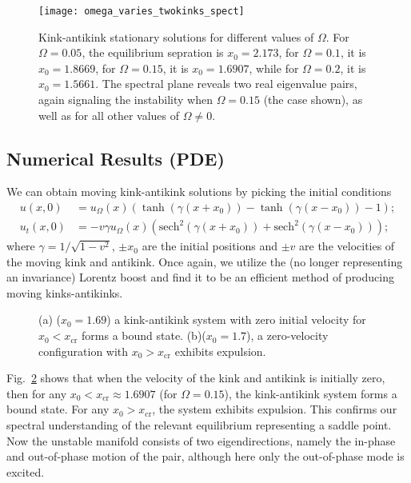 \documentclass[vecphys]{svmult}		%
\newcommand{\sech}{\text{sech}}
\begin{document}
 \begin{figure}[h]
	\centering 
		\texttt{[image: omega\_varies\_twokinks\_spect]}

	\caption{ Kink-antikink stationary solutions for
        different values of $\Omega$. For $\Omega=0.05$, the equilibrium
        sepration is $x_0=2.173$, for $\Omega=0.1$, it is $x_0=1.8669$, for
        $\Omega=0.15$, it is $x_0=1.6907$, while for $\Omega=0.2$,
        it is $x_0=1.5661$. The spectral plane reveals two real eigenvalue
        pairs, again signaling the instability when $\Omega=0.15$ (the
        case shown), as well as for all other values of $\Omega \neq 0$.} %
	\label{kink-antikink}
\end{figure} 


\subsection{Numerical Results (PDE)}
We can obtain moving kink-antikink solutions by picking the initial conditions 
\begin{align*}u(x,0)&=u_{\Omega}(x) (\tanh(\gamma (x+x_0))- \tanh(\gamma (x-x_0))-1); \\
u_t(x,0)&=-v \gamma u_{\Omega}(x) (\sech^2(\gamma(x+x_0))+ \sech^2(\gamma(x-x_0)));
\end{align*}
where $\gamma=1/\sqrt{1-v^2}$, $\pm x_0$ are 
the initial positions and $\pm v$ are the velocities of the moving kink
and antikink.
Once again,
we utilize the (no longer representing an invariance) Lorentz boost
and find it to be an efficient method of producing moving kinks-antikinks.






\begin{figure}[tbp]
\begin{center}
  \end{center}
   \caption{(a) ($x_0=1.69$) a kink-antikink system with zero initial velocity for $x_0 < x_\mathrm{cr}$ forms a bound state. (b)($x_0=1.7$), a zero-velocity configuration with $x_0>x_\mathrm{cr}$ exhibits expulsion.}
    \label{before_after_xc}
\end{figure}

Fig.~\ref{before_after_xc} shows that when the velocity of the kink and antikink is initially zero, then for any $x_0<x_\mathrm{cr}\approx 1.6907$ (for $\Omega=0.15$), the kink-antikink system forms a bound state. For any $x_0>x_\mathrm{cr}$, the system exhibits expulsion. This confirms our spectral understanding
of the relevant equilibrium representing a saddle point. Now the unstable
manifold consists of two eigendirections, namely the in-phase and out-of-phase
motion of the pair, although here only the out-of-phase mode is excited.
\end{document}
